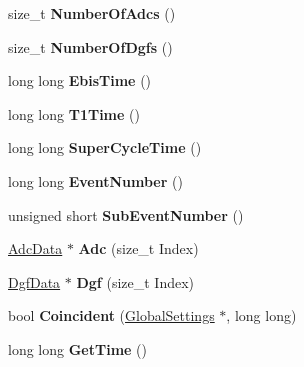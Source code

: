 \begin{DoxyCompactItemize}
size\+\_\+t {\bfseries Number\+Of\+Adcs} ()
\item 
\mbox{\label{class_built_event_a5c01e6c2ada2435c6d7309dc7cb2fa5c}} 
size\+\_\+t {\bfseries Number\+Of\+Dgfs} ()
\item 
\mbox{\label{class_built_event_aac0e9789b3e193a60c28a8c7643c37c1}} 
long long {\bfseries Ebis\+Time} ()
\item 
\mbox{\label{class_built_event_adbe7cecefb72c1429bb46fb38839b6ed}} 
long long {\bfseries T1\+Time} ()
\item 
\mbox{\label{class_built_event_a3bcfcdef39836deeae613b1feadce8ca}} 
long long {\bfseries Super\+Cycle\+Time} ()
\item 
\mbox{\label{class_built_event_a699e90b7621ae7e8e139c0f9f7ac36df}} 
long long {\bfseries Event\+Number} ()
\item 
\mbox{\label{class_built_event_a634ff74c48a2414782e5b55a606d9c02}} 
unsigned short {\bfseries Sub\+Event\+Number} ()
\item 
\mbox{\label{class_built_event_aa031a6f9f75054f4bcd34a5ae0434211}} 
\hyperlink{class_adc_data}{Adc\+Data} $\ast$ {\bfseries Adc} (size\+\_\+t Index)
\item 
\mbox{\label{class_built_event_ad0baf9c54126df4ef5be7110283d1a4d}} 
\hyperlink{class_dgf_data}{Dgf\+Data} $\ast$ {\bfseries Dgf} (size\+\_\+t Index)
\item 
\mbox{\label{class_built_event_a264f67ad32d955fa2ff389c923bc69b0}} 
bool {\bfseries Coincident} (\hyperlink{class_global_settings}{Global\+Settings} $\ast$, long long)
\item 
\mbox{\label{class_built_event_af5244b5b93aa8e0adfcaf3fa70be5617}} 
long long {\bfseries Get\+Time} ()
\end{DoxyCompactItemize}
